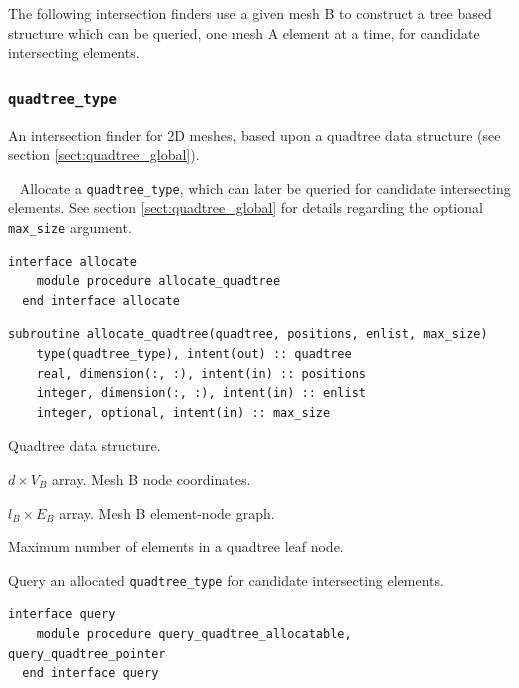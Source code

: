 \documentclass{article}
\begin{document}
The following intersection finders use a given mesh B to construct a tree based
structure which can be queried, one mesh A element at a time, for candidate
intersecting elements.

\subsubsection{\texttt{quadtree\_type}}\label{sect:quadtree_query}
  
An intersection finder for 2D meshes, based upon a quadtree data structure (see
section \ref{sect:quadtree_global}).

~\newline
Allocate a \verb+quadtree_type+, which can later be queried for candidate
intersecting elements. See section \ref{sect:quadtree_global} for details
regarding the optional \verb+max_size+ argument.

\begin{lstlisting}[language=FORTRAN]
  interface allocate
    module procedure allocate_quadtree
  end interface allocate
\end{lstlisting}
  
\begin{lstlisting}[language=FORTRAN]
  subroutine allocate_quadtree(quadtree, positions, enlist, max_size)
    type(quadtree_type), intent(out) :: quadtree
    real, dimension(:, :), intent(in) :: positions
    integer, dimension(:, :), intent(in) :: enlist
    integer, optional, intent(in) :: max_size 
\end{lstlisting}

\begin{description}[font=\ttfamily\bfseries,leftmargin=2.2\parindent,labelindent=1.7\parindent,noitemsep]
  \item[quadtree] Quadtree data structure.
  \item[positions] $d \times V_B$ array. Mesh B node coordinates.
  \item[enlist] $l_B \times E_B$ array. Mesh B element-node graph.
  \item[max\_size] Maximum number of elements in a quadtree leaf node.
\end{description}

\noindent Query an allocated \verb+quadtree_type+ for candidate intersecting
elements.
  
\begin{lstlisting}[language=FORTRAN]
  interface query
    module procedure query_quadtree_allocatable, query_quadtree_pointer
  end interface query
\end{lstlisting}
    
\end{document}
